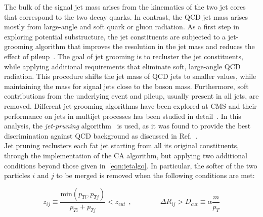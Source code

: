 The bulk of the signal jet mass arises from the kinematics of the two jet cores that correspond to the two decay quarks. In contrast, the QCD jet mass arises mostly from large-angle and soft quark or gluon radiation.
As a first step in exploring potential substructure, the jet constituents are subjected to a jet-grooming algorithm that improves the resolution in the jet mass and reduces the effect of pileup~\cite{Chatrchyan:2013vbb,Khachatryan:2014vla}. The goal of jet grooming is to recluster the jet constituents, while applying additional requirements that eliminate soft, large-angle QCD radiation. This procedure shifts the jet mass of QCD jets to smaller values, while maintaining the mass for signal jets close to the boson mass. Furthermore, soft contributions from the underlying event and pileup, usually present in all jets, are removed.
Different jet-grooming algorithms have been explored at CMS and their performance on jets in multijet processes has been studied in detail~\cite{Chatrchyan:2013vbb,Khachatryan:2014vla}. In this analysis, the \emph{jet-pruning} algorithm~\cite{jetpruning1,Ellis:2009me} is used, as it was found to provide the best discrimination against QCD background as discussed in Ref.~\cite{Chatrchyan:2013vbb,Khachatryan:2014vla}.\\

Jet pruning reclusters each fat jet starting from all its original constituents, through the implementation of the CA algorithm, but applying two additional conditions beyond those given in~\ref{eqn:jetalgo}. In particular, the softer of the two particles $i$ and $j$ to be merged is removed when the following conditions are met:

\begin{equation}
z_{ij} \equiv \frac{\mathrm{min}(p_{Ti},p_{Tj})}{p_{Ti} + p_{Tj}} < z_{cut}\:\:,
\quad\quad\quad\quad
\Delta R_{ij} > D_{cut} \equiv \alpha\frac{m}{p_T}
\end{equation}

